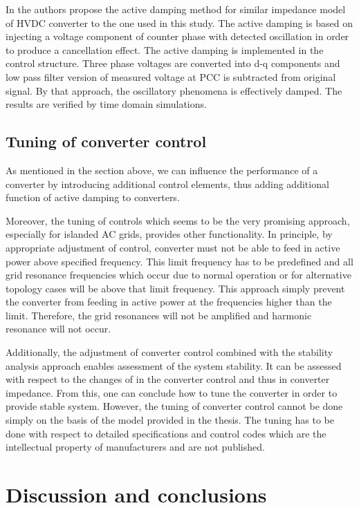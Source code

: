 \documentclass[12pt]{report} %
\begin{document}
In \cite{amin2015} the authors propose the active damping method for similar impedance model of HVDC converter to the one used in this study. The active damping \cite{amin2015} is based on injecting a voltage component of counter phase with detected oscillation in order to produce a cancellation effect. The active damping is implemented in the control structure. Three phase voltages are converted into d-q components and low pass filter version of measured voltage at PCC is subtracted from original signal. By that approach, the oscillatory phenomena is effectively damped. The results are verified by time domain simulations.

\section{Tuning of converter control}
As mentioned in the section above, we can influence the performance of a converter by introducing additional control elements, thus adding additional function of active damping to converters.

Moreover, the tuning of controls which seems to be the very promising approach, especially for islanded AC grids, provides other functionality. In principle, by appropriate adjustment of control, converter must not be able to feed in active power above specified frequency. This limit frequency has to be predefined and all grid resonance frequencies which occur due to normal operation or for alternative topology cases will be above that limit frequency. This approach simply prevent the converter from feeding in active power at the frequencies higher than the limit. Therefore, the grid resonances will not be amplified and harmonic resonance will not occur.

Additionally, the adjustment of converter control combined with the stability analysis approach enables assessment of the system stability. It can be assessed with respect to the changes of in the converter control and thus in converter impedance. From this, one can conclude how to tune the converter in order to provide stable system. However, the tuning of converter control cannot be done simply on the basis of the model provided in the thesis. The tuning has to be done with respect to detailed specifications and control codes which are the intellectual property of manufacturers and are not published.


\chapter{Discussion and conclusions}
\end{document}
